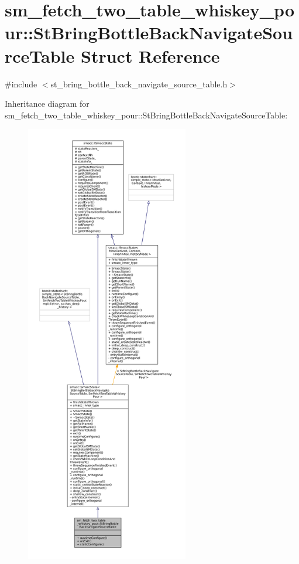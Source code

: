 \hypertarget{structsm__fetch__two__table__whiskey__pour_1_1StBringBottleBackNavigateSourceTable}{}\section{sm\+\_\+fetch\+\_\+two\+\_\+table\+\_\+whiskey\+\_\+pour\+:\+:St\+Bring\+Bottle\+Back\+Navigate\+Source\+Table Struct Reference}
\label{structsm__fetch__two__table__whiskey__pour_1_1StBringBottleBackNavigateSourceTable}


{\ttfamily \#include $<$st\+\_\+bring\+\_\+bottle\+\_\+back\+\_\+navigate\+\_\+source\+\_\+table.\+h$>$}



Inheritance diagram for sm\+\_\+fetch\+\_\+two\+\_\+table\+\_\+whiskey\+\_\+pour\+:\+:St\+Bring\+Bottle\+Back\+Navigate\+Source\+Table\+:
\nopagebreak
\begin{figure}[H]
\begin{center}
\leavevmode
\includegraphics[height=550pt]{structsm__fetch__two__table__whiskey__pour_1_1StBringBottleBackNavigateSourceTable__inherit__graph}
\end{center}
\end{figure}


